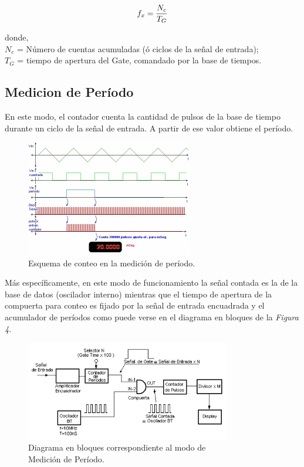 \documentclass{article}
\begin{document}
\begin{equation}
	f_x = {N_c \over T_G}
\end{equation}
\medskip

\noindent donde, \\
$N_c$ = Número de cuentas acumuladas (ó ciclos de la señal de entrada);\\
$T_G$ = tiempo de apertura del Gate, comandado por la base de tiempos.
\bigskip\bigskip



\subsection {Medicion de Período}
		
	En este modo, el contador cuenta la cantidad de pulsos de la base de tiempo durante un ciclo de la señal de entrada. A partir de ese valor obtiene el período. 
\bigskip\bigskip


\begin{figure}[h]
	\centering
	\includegraphics[width=0.65\textwidth]{images/03-ondasPeriodoContador.jpg}
	\medskip
	\caption{Esquema de conteo en la medición de período.}
\end{figure}
\bigskip\bigskip


	Más específicamente, en este modo de funcionamiento la señal contada es la de la base de datos (oscilador interno) mientras que el tiempo de apertura de la compuerta para conteo es fijado por la señal de entrada encuadrada y el acumulador de períodos como puede verse en el diagrama en bloques de la \textit{Figura 4}.
\bigskip\bigskip


\begin{figure}[h]
	\centering
	\includegraphics[width=0.80\textwidth]{images/04-diagrama-en-bloques-modo-medicion-periodo.jpg}
	\medskip
	\caption{Diagrama en bloques correspondiente al modo de\\ Medición de Período.}
\end{figure}
\bigskip\bigskip
\end{document}
